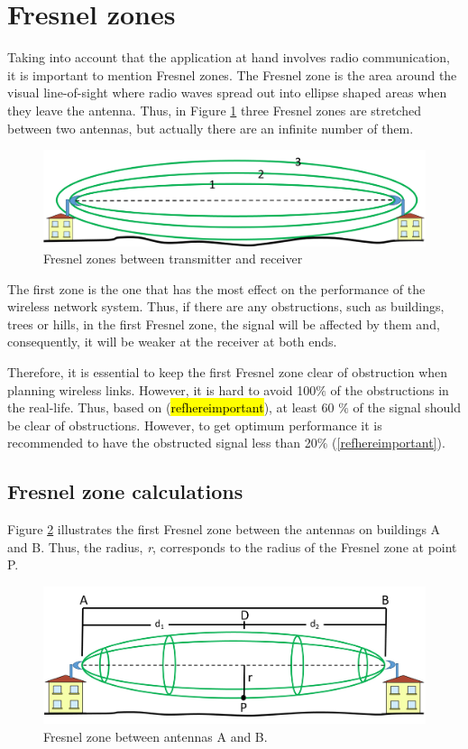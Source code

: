 \section{Fresnel zones}\label{sec:fresnel}
Taking into account that the application at hand involves radio communication, it is important to mention Fresnel zones. The Fresnel zone is the area around the visual line-of-sight where radio waves spread out into ellipse shaped areas when they leave the antenna. Thus, in Figure \ref{fig:3fresnel_zones} three Fresnel zones are stretched between two antennas, but actually there are an infinite number of them.

\begin{figure}[H]
	\centering
	\includegraphics[scale=0.65]{figures/fresnel_zones.png}
	\caption{Fresnel zones between transmitter and receiver}
	\label{fig:3fresnel_zones}
\end{figure}

The first zone is the one that has the most effect on the performance of the wireless network system. Thus, if there are any obstructions, such as buildings, trees or hills, in the first Fresnel zone, the signal will be affected by them and, consequently, it will be weaker at the receiver at both ends.

Therefore, it is essential to keep the first Fresnel zone clear of obstruction when planning wireless links. However, it is hard to avoid 100$\%$ of the obstructions in the real-life. Thus, based on (\hl{refhereimportant}), at least 60 $\%$ of the signal should be clear of obstructions. However, to get optimum performance it is recommended to have the obstructed signal less than 20$\%$ (\ref{refhereimportant}).

\subsection{Fresnel zone calculations}
Figure \ref{fig:fresnel_zones} illustrates the first Fresnel zone between the antennas on buildings A and B. Thus, the radius, \textit{r}, corresponds to the radius of the Fresnel zone at point P. 

\begin{figure}[H]
	\centering
	\includegraphics[scale=0.60]{figures/fresnel_zone.png}
	\caption{Fresnel zone between antennas A and B.}
	\label{fig:fresnel_zones}
\end{figure} 

